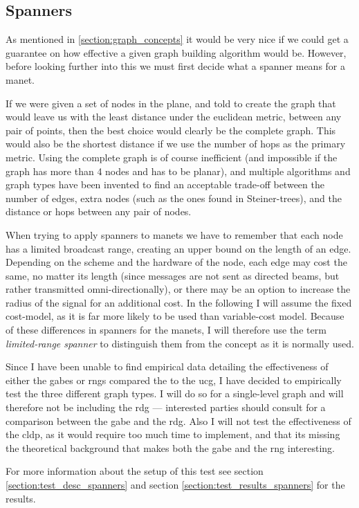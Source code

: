 
\subsection{Spanners}
\label{section:spanners}
As mentioned in \ref{section:graph_concepts} it would be very nice if we could get a guarantee on how effective a given graph building algorithm would be. However, before looking further into this we must first decide what a spanner means for a \ac{manet}.

If we were given a set of nodes in the plane, and told to create the graph that would leave us with the least distance under the euclidean metric, between any pair of points, then the best choice would clearly be the complete graph. This would also be the shortest distance if we use the number of hops as the primary metric. Using the complete graph is of course inefficient (and impossible if the graph has more than 4 nodes and has to be planar), and multiple algorithms and graph types have been invented to find an acceptable trade-off between the number of edges, extra nodes (such as the ones found in Steiner-trees), and the distance or hops between any pair of nodes.

When trying to apply spanners to \acp{manet} we have to remember that each node has a limited broadcast range, creating an upper bound on the length of an edge. Depending on the scheme and the hardware of the node, each edge may cost the same, no matter its length (since messages are not sent as directed beams, but rather transmitted omni-directionally), or there may be an option to increase the radius of the signal for an additional cost. In the following I will assume the fixed cost-model, as it is far more likely to be used than variable-cost model. Because of these differences in spanners for the \acp{manet}, I will therefore use the term \emph{limited-range spanner} to distinguish them from the concept as it is normally used. 

Since I have been unable to find empirical data detailing the effectiveness of either the \acp{gabe} or \acp{rng} compared the to the \ac{ucg}, I have decided to empirically test the three different graph types. I will do so for a single-level graph and will therefore not be including the \ac{rdg} --- interested parties should consult \cite{GeoSpanners} for a comparison between the \ac{gabe} and the \ac{rdg}. Also I will not test the effectiveness of the \ac{cldp}, as it would require too much time to implement, and that its missing the theoretical background that makes both the \ac{gabe} and the \ac{rng} interesting.

For more information about the setup of this test see section \ref{section:test_desc_spanners} and section \ref{section:test_results_spanners} for the results.
